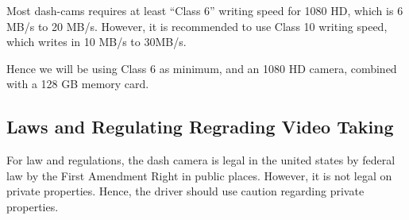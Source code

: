 \documentclass[10pt,draftclsnofoot,onecolumn,journal,compsoc]{IEEEtran}
\begin{document}
Most dash-cams requires at least “Class 6” writing speed for 1080 HD, which is 6 MB/s to 20 MB/s. However, it is recommended to use Class 10 writing speed, which writes in 10 MB/s to 30MB/s. 

Hence we will be using Class 6 as minimum, and an 1080 HD camera, combined with a 128 GB memory card.

\subsection{Laws and Regulating Regrading Video Taking} For law and regulations, the dash camera is legal in the united states by federal law by the First Amendment Right in public places. However, it is not legal on private properties. Hence, the driver should use caution regarding private properties.
\end{document}
